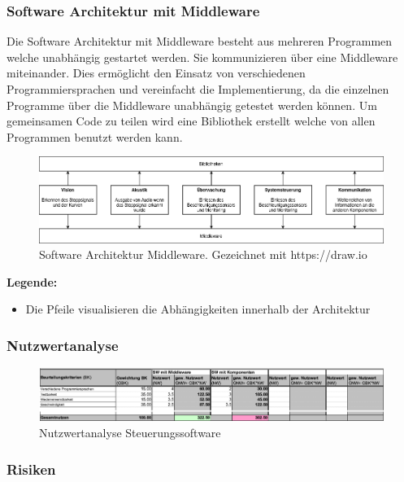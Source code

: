 \documentclass[../../main.tex]{subfiles}
\begin{document}
\subsubsection{Software Architektur mit Middleware}
Die Software Architektur mit Middleware besteht aus mehreren Programmen welche unabhängig gestartet werden.
Sie kommunizieren über eine Middleware miteinander.
Dies ermöglicht den Einsatz von verschiedenen Programmiersprachen und vereinfacht die Implementierung,
da die einzelnen Programme über die Middleware unabhängig getestet werden können.
Um gemeinsamen Code zu teilen wird eine Bibliothek erstellt welche von allen Programmen benutzt werden kann.

\begin{figure}[H] %
    \centering
    \includegraphics[width=1.0\textwidth]{../../drawings/ArchitekturDiagramm/SW_Architektur_Middleware.png}
    \caption {Software Architektur Middleware. Gezeichnet mit https://draw.io}
\end{figure}

\textbf{Legende:}
\begin{itemize}
    \item Die Pfeile visualisieren die Abhängigkeiten innerhalb der Architektur
\end{itemize}

\subsubsection{Nutzwertanalyse}
\begin{figure}[H]
    \centering
    \includegraphics[width=1.0\textwidth]{../../images/Steuerungssoftware/Nutzwertanalyse_Steuerungssoftware.png}
    \caption {Nutzwertanalyse Steuerungssoftware}
\end{figure}

\subsubsection{Risiken}
\end{document}
